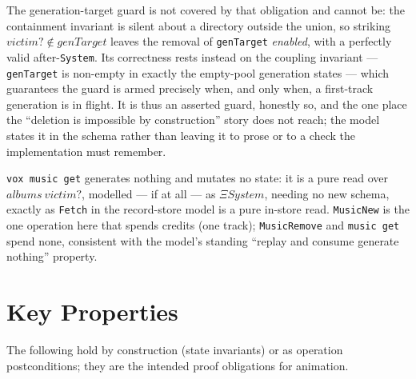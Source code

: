 \documentclass[a4paper,10pt,fleqn]{article}
\begin{document}
The generation-target guard is not covered by that obligation and cannot be:
the containment invariant is silent about a directory outside the union, so
striking $victim? \notin genTarget$ leaves the removal of \texttt{genTarget}
\emph{enabled}, with a perfectly valid after-\texttt{System}. Its correctness
rests instead on the coupling invariant --- \texttt{genTarget} is non-empty in
exactly the empty-pool generation states --- which guarantees the guard is
armed precisely when, and only when, a first-track generation is in flight. It
is thus an asserted guard, honestly so, and the one place the ``deletion is
impossible by construction'' story does not reach; the model states it in the
schema rather than leaving it to prose or to a check the implementation must
remember.

\texttt{vox music get} generates nothing and mutates no state: it is a pure read
over $albums~victim?$, modelled --- if at all --- as \texttt{$\Xi System$},
needing no new schema, exactly as \texttt{Fetch} in the record-store model is a
pure in-store read. \texttt{MusicNew} is the one operation here that spends
credits (one track); \texttt{MusicRemove} and \texttt{music get} spend none,
consistent with the model's standing ``replay and consume generate nothing''
property.

\section{Key Properties}

The following hold by construction (state invariants) or as operation
postconditions; they are the intended proof obligations for animation.
\end{document}
